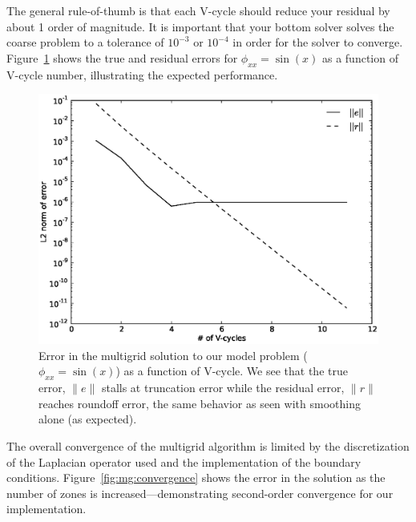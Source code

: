 The general rule-of-thumb is that each V-cycle should reduce your
residual by about 1 order of magnitude.  It is important that your
bottom solver solves the coarse problem to a tolerance of $10^{-3}$ or
$10^{-4}$ in order for the solver to converge.  Figure~\ref{fig:mgerror}
shows the true and residual errors for $\phi_{xx} = \sin(x)$ as a function
of V-cycle number, illustrating the expected performance.


\begin{figure}
\centering
\includegraphics[width=0.85\linewidth]{mg_error_vs_cycle}
\caption[Error in solution as a function of multigrid V-cycle
  number]{\label{fig:mgerror} Error in the multigrid solution to our
  model problem ($\phi_{xx} = \sin(x)$) as a function of V-cycle.  We
  see that the true error, $\|e\|$ stalls at truncation error while
  the residual error, $\|r\|$ reaches roundoff error, the same
  behavior as seen with smoothing alone (as expected). \\
  }
\end{figure}

The overall convergence of the multigrid algorithm is limited by the
discretization of the Laplacian operator used and the implementation
of the boundary conditions.  Figure~\ref{fig:mg:convergence} shows
the error in the solution as the number of zones is increased---demonstrating
second-order convergence for our implementation.

